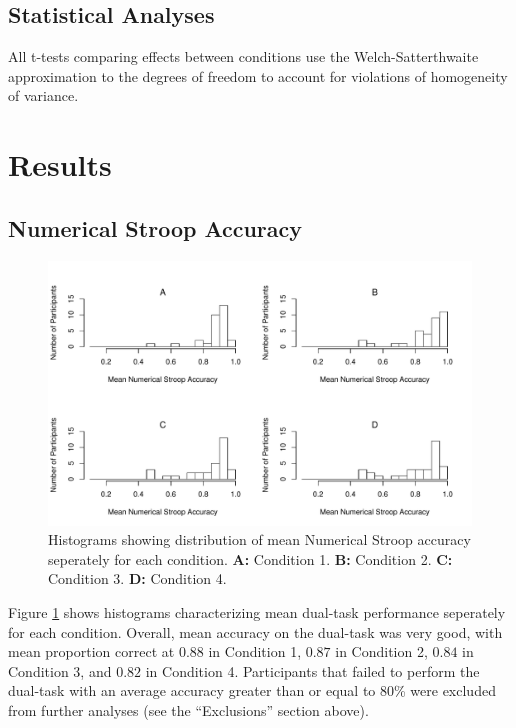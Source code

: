 \documentclass[man,apacite,draftfirst]{apa6}
\begin{document}
\subsection*{Statistical Analyses}
All t-tests comparing effects between conditions use the Welch-Satterthwaite
approximation to the degrees of freedom to account for violations of homogeneity
of variance.

\section*{Results}
\subsection*{Numerical Stroop Accuracy}
\begin{figure}[t]
\centering \includegraphics[width=1.0\textwidth]{../figures/fig_exc_dual.pdf}
    \caption{ Histograms showing distribution of mean Numerical Stroop accuracy
seperately for each condition. \textbf{A:} Condition 1. \textbf{B:} Condition 2.
\textbf{C:} Condition 3. \textbf{D:} Condition 4. }
    \label{fig:exc_dual}
\end{figure}

Figure \ref{fig:exc_dual} shows histograms characterizing mean dual-task
performance seperately for each condition. Overall, mean accuracy on the
dual-task was very good, with mean proportion correct at $0.88$ in Condition 1,
$0.87$ in Condition 2, $0.84$ in Condition 3, and $0.82$ in Condition 4.
Participants that failed to perform the dual-task with an average accuracy
greater than or equal to 80\% were excluded from further analyses (see the
``Exclusions'' section above).
\end{document}
